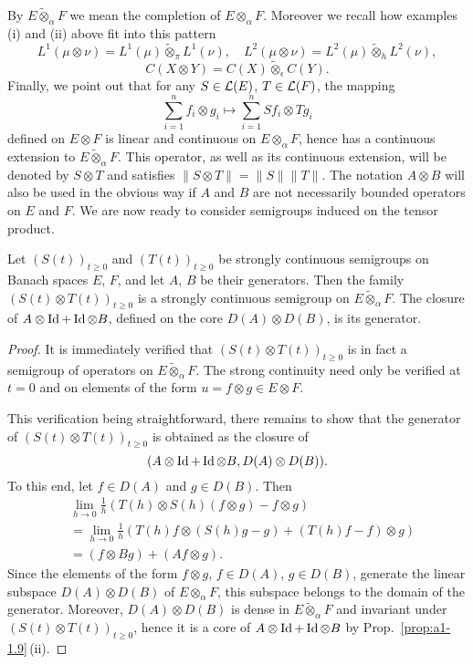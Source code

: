 By $E \widetilde{\otimes}_{\alpha} F$ we mean the completion of $E \otimes_{\alpha} F$. 
Moreover we recall how examples (i) and (ii) above fit into this pattern
\[
    L^{1}(\mu \otimes \nu) = L^{1}(\mu) \widetilde{\otimes}_{\pi} L^{1}(\nu), 
    \quad L^{2}(\mu \otimes \nu) = L^{2}(\mu) \widetilde{\otimes}_{h} L^{2}(\nu),
\]
\[
    C(X \otimes Y) = C(X) \widetilde{\otimes}_{\epsilon} C(Y).
\]
Finally, we point out that for any $S \in \mathcal{L}(E)$, $T \in \mathcal{L}(F) $, the mapping
\[
    \sum_{i=1}^{n}f_{i} \otimes g_{i} \mapsto \sum_{i=1}^{n}Sf_{i} \otimes Tg_{i}
\]
defined on $E \otimes F$ is linear and continuous on $E \otimes_{\alpha} F$, hence has a continuous extension to $ E \widetilde{\otimes}_{\alpha} F$. 
This operator, as well as its continuous extension, will be denoted by $S \otimes T$ and satisfies $\|S \otimes T\| = \|S\|\|T\|$. 
The notation $A \otimes B$ will also be used in the obvious way if $A$ and $B$ are not necessarily bounded operators on $E$ and $F$. 
We are now ready to consider semigroups induced on the tensor product.
\begin{proposition}\label{prop:a1-3.7}
Let $(S(t))_{t\geq 0}$ and $(T(t))_{t\geq 0}$ be strongly continuous semigroups on Banach spaces $E$, $F$, and let $A$, $B$ be their generators. 
Then the family $(S(t) \otimes T(t))_{t\geq 0}$ is a strongly continuous semigroup on 
$ E \widetilde{\otimes}_{\alpha} F $.
The closure of $A \otimes \operatorname{Id} + \operatorname{Id} \otimes B$, defined on the core $D(A) \otimes D(B)$, is its generator.
\end{proposition}
\begin{proof}
It is immediately verified that $(S(t)\otimes T(t))_{t\geq 0}$ is in fact a semigroup of operators on 
$ E \widetilde{\otimes}_{\alpha} F $. 
The strong continuity need only be verified at $t = 0$ and on elements of the form $u = f \otimes g \in E \otimes F$.

This verification being straightforward, there remains to show that the generator of $(S(t)\otimes T(t))_{t\geq 0}$ is obtained as the closure of 
%
\[
	(A \otimes \operatorname{Id} + \operatorname{Id} \otimes B,D(A) \otimes D(B)) .
\]
%
To this end, let $f \in D(A)$ and $g \in D(B)$. 
Then
\begin{align*}
    &\lim_{h\to 0} \frac{1}{h}(T(h) \otimes S(h)(f \otimes g)-f \otimes g) \\
    &= \lim_{h\to 0} \frac{1}{h}(T(h)f \otimes (S(h)g-g) + (T(h)f-f) \otimes g) \\
    &= (f \otimes Bg) + (Af \otimes g) .
\end{align*}
Since the elements of the form $f \otimes g$, $f \in D(A)$, $g \in D(B)$, generate the linear subspace $D(A) \otimes D(B)$ of $E \otimes_{\alpha} F$, this subspace belongs
to the domain of the generator.
Moreover, $D(A) \otimes D(B)$ is dense in $E \widetilde{\otimes}_{\alpha} F$ and invariant under $(S(t)\otimes T(t))_{t\geq 0}$, hence it is a core of $A \otimes \operatorname{Id} + \operatorname{Id} \otimes B$ by Prop.~\ref{prop:a1-1.9}\,(ii).
\end{proof}
